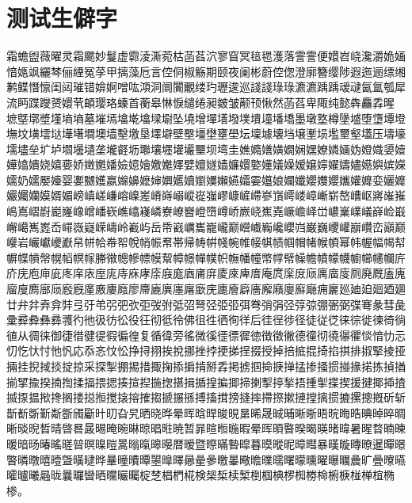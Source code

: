 \section{测试生僻字}

霜蟾盥薇曜灵霜颸妙鬘虚霩淩澌菀枯菡萏泬寥窅冥毰毸濩落霅霅便嬛岧峣瀺灂姽婳愔嫕飒纚棽俪緸冤莩甲摛藻卮言倥侗椒觞期颐夜阑彬蔚倥偬澄廓簪缨陟遐迤逦缥缃鹣鲽憯懔闺闼璀错媕婀噌吰澒洞阛闠覼缕玓瓑逡巡諓諓琭琭瀌瀌踽踽叆叇氤氲瓠犀流眄蹀躞赟嬛茕頔璎珞螓首蘅皋惏悷缱绻昶皴皱颟顸愀然菡萏卑陬纯懿犇麤掱暒 墌墍墎墏墐墒墒墓墔墕墖墘墖墚墛坠墝增墠墡墢墣墤墥墦墧墨墩墪樽墬墭堕墯墰墱墲坟墴墵垯墷墸墹墺墙墼墽垦墿壀壁壂壃壄壅壆坛壈壉壊垱壌壍埙壏壐壑壒压壔壕壖壗垒圹垆壛壜壝垄壠壡坜壣壤壥壦壧壨坝塆圭嫶嫷嫸嫹嫺娴嫼嫽嫾婳妫嬁嬂嬃嬄嬅嬆嬇娆嬉嬊娇嬍嬎嬏嬐嬑嬒嬓嬔嬕嬖嬗嬘嫱嬚嬛嬜嬞嬟嬠嫒嬢嬣嬥嬦嬧嬨嬩嫔嬫嬬奶嬬嬮嬯婴嬱嬲嬳嬴嬵嬶嬷婶嬹嬺嬻嬼嬽嬾嬿孀孁孂娘孄孅孆孇孆孈孉孊娈孋孊孍孎孏嫫婿媚嵭嵮嵯嵰嵱嵲嵳嵴嵵嵶嵷嵸嵹嵺嵻嵼嵽嵾嵿嶀嵝嶂嶃崭嶅嶆岖嶈嶉嶊嶋嶌嶍嶎嶏嶐嶑嶒嶓嵚嶕嶖嶘嶙嶚嶛嶜嶝嶞嶟峤嶡峣嶣嶤嶥嶦峄峃嶩嶪嶫嶬嶭崄嶯嶰嶱嶲嶳岙嶵嶶嶷嵘嶹岭嶻屿岳帋巀巁巂巃巄巅巆巇巈巉巊岿巌巍巎巏巐巑峦巓巅巕岩巗巘巙巚帠帡帢帣帤帨帩帪帬帯帰帱帲帴帵帷帹帺帻帼帽帾帿幁幂帏幄幅幆幇幈幉幊幋幌幍幎幏幐幑幒幓幖幙幚幛幜幝幞帜幠幡幢幤幥幦幧幨幩幪幭幮幯幰幱庍庎庑庖庘庛庝庠庡庢庣庤庥庨庩庪庬庮庯庰庱庲庳庴庵庹庺庻庼庽庿廀厕廃厩廅廆廇廋廌廍庼廏廐廑廒廔廕廖廗廘廙廛廜廞庑廤廥廦廧廨廭廮廯廰痈廲廵廸廹廻廼廽廿弁弅弆弇弉弖弙弚弜弝弞弡弢弣弤弨弩弪弫弬弭弮弰弲弪弴弶弸弻弼弽弿彖彗彘彚彛彜彝彞彟彴彵彶彷彸役彺彻彽彾佛徂徃徆徇徉后徍徎徏径徒従徔徕徖徙徚徛徜徝从徟徕御徢徣徤徥徦徧徨复循徫旁徭微徯徰徱徲徳徴徵徶德徸彻徺忁忂惔愔忇忈忉忔忕忖忚忛応忝忞忟忪挣挦挧挨挩挪挫挬挭挮挰掇授掉掊掋掍掎掐掑排掓掔掕挜掚挂掜掝掞掟掠采探掣掤掦措掫掬掭掮掯掰掱掲掳掴掵掶掸掹掺掻掼掽掾掿拣揁揂揃揅揄揆揇揈揉揊揋揌揍揎揑揓揔揕揖揗揘揙揤揥揦揧揨揫捂揰揱揲揳援揵揶揷揸揻揼揾揿搀搁搂搃搄搅搇搈搉搊搋搌搎搏搐搑搒摓摔摕摖摗摙摚摛掼摝摞摠摡斫斩斮斱斲斳斴斵斶斸旪旫旮旯晒晓晔晕晖晗晘晙晛晜晞晟晠晡晰晣晤晥晦晧晪晫晬晭晰晱晲晳晴晵晷晸晹晻晼晽晾晿暀暁暂暃暄暅暆暇晕晖暊暋暌暍暎暏暐暑暒暓暔暕暖暗旸暙暚暛暜暝暞暟暠暡暣暤暥暦暧暨暩暪暬暭暮暯暰昵暲暳暴暵暶暷暸暹暺暻暼暽暾暿曀曁曂曃晔曅曈曊曋曌曍曎曏曐曑曒曓曔曕曗曘曙曚曛曜曝曞曟旷曡曢曣曤曥曦曧昽曩曪曫晒曭曮曯椗椘椙椚椛検椝椞椟椠椡椢椣椤椥椦椧椨椩椪椫椬椭椮。
